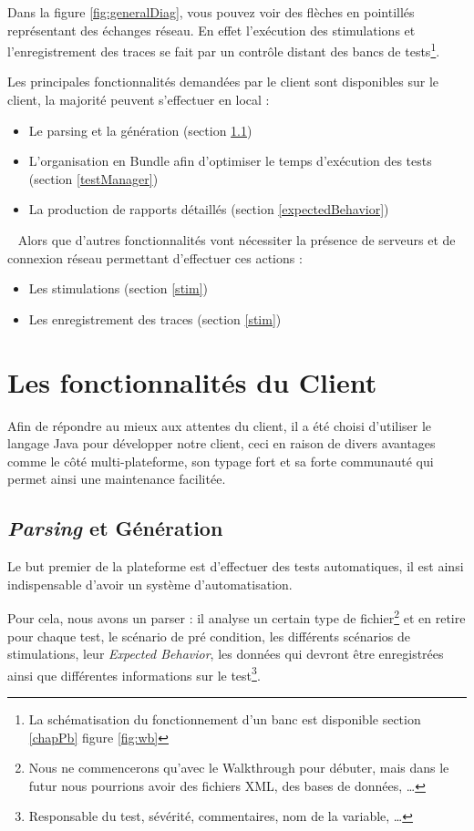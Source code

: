 Dans la figure \ref{fig:generalDiag}, vous pouvez voir des flèches en pointillés représentant des échanges réseau. En effet
l'exécution des stimulations et l'enregistrement des traces se fait par un contrôle distant des bancs de tests\footnote{La
	schématisation du fonctionnement d'un banc est disponible section \ref{chapPb} figure \ref{fig:wb}}.

Les principales fonctionnalités demandées par le client sont disponibles sur le client, la majorité peuvent s'effectuer en local : 
\begin{itemize}
	\item Le parsing et la génération (section \ref{generation})
	\item L'organisation en Bundle afin d'optimiser le temps d'exécution des tests (section \ref{testManager})
	\item La production de rapports détaillés (section \ref{expectedBehavior})
\end{itemize}~\newline
Alors que d'autres fonctionnalités vont nécessiter la présence de serveurs et de connexion réseau permettant d'effectuer ces actions
: 
\begin{itemize}
	\item Les stimulations (section \ref{stim})
	\item Les enregistrement des traces (section \ref{stim})
\end{itemize}
\vspace{-10px}
\section{Les fonctionnalités du Client}
Afin de répondre au mieux aux attentes du client, il a été choisi d'utiliser le langage Java pour développer notre client, ceci en raison de
divers avantages comme le côté multi-plateforme, son typage fort et sa forte communauté qui permet ainsi une maintenance facilitée. 

\subsection{\textit{Parsing} et Génération}\label{generation}
Le but premier de la plateforme est d'effectuer des tests automatiques, il est ainsi indispensable d'avoir un système d'automatisation.

Pour cela, nous avons un parser : il analyse un certain type de fichier\footnote{Nous ne commencerons qu'avec le Walkthrough pour débuter, mais dans le futur nous pourrions avoir des fichiers XML, des bases de données, \ldots} et en retire pour chaque test, le scénario de pré condition, les différents scénarios de stimulations, leur \textit{Expected Behavior}, les données qui devront être enregistrées ainsi que différentes informations sur le test\footnote{Responsable du test, sévérité, commentaires, nom de la variable, \ldots}.

